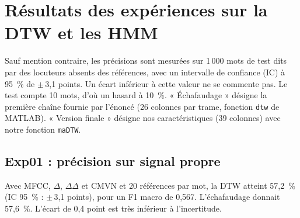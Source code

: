 
\newcommand{\fichemodele}[6]{%
  \begin{center}\footnotesize
  \renewcommand{\arraystretch}{1.15}
  \begin{tabular}{@{}>{\raggedright\arraybackslash}p{0.20\linewidth}>{\raggedright\arraybackslash}p{0.76\linewidth}@{}}
    \toprule
    \textbf{Référence} & #1\\
    \midrule
    \textbf{Idée} & #2\\
    \textbf{Protocole et résultats} & #3\\
    \textbf{Coût} & #4\\
    \textbf{Limites} & #5\\
    \textbf{Utilité pour nous} & #6\\
    \bottomrule
  \end{tabular}
  \end{center}}

\section{Résultats des expériences sur la DTW et les HMM}

Sauf mention contraire, les précisions sont mesurées sur 1\,000 mots de test dits par des locuteurs absents des références, avec un intervalle de confiance (IC) à 95~\% de $\pm$\,3,1 points. Un écart inférieur à cette valeur ne se commente pas. Le test compte 10 mots, d'où un hasard à 10~\%. « Échafaudage » désigne la première chaîne fournie par l'énoncé (26 colonnes par trame, fonction \texttt{dtw} de MATLAB). « Version finale » désigne nos caractéristiques (39 colonnes) avec notre fonction \texttt{maDTW}.

\subsection{Exp01 : précision sur signal propre}

Avec MFCC, $\Delta$, $\Delta\Delta$ et CMVN et 20 références par mot, la DTW atteint 57,2~\% (IC 95~\% : $\pm$\,3,1 points), pour un F1 macro de 0,567. L'échafaudage donnait 57,6~\%. L'écart de 0,4 point est très inférieur à l'incertitude.

